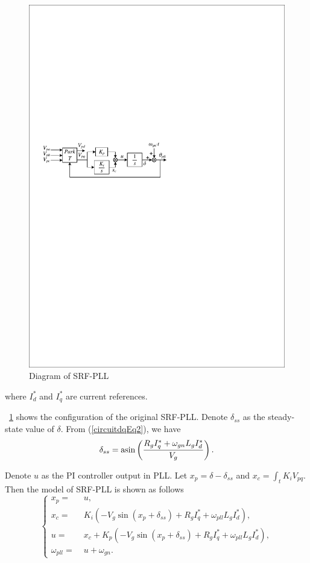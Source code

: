 \documentclass[10pt,final,journal,twoside]{IEEEtran}
\begin{document}
\begin{figure}[!t]
\centering
\includegraphics[width=.9\linewidth]{../Diagrams/PLL.pdf}
\caption{Diagram of SRF-PLL}
\label{fig_pll}
\end{figure}
where $I_d^*$ and $I_q^*$ are current references.\par
\figurename~\ref{fig_pll} shows the configuration of the original SRF-PLL. Denote $\delta_{ss}$ as the steady-state value of $\delta$. From (\ref{circuitdqEq2}), we have
\begin{equation}\label{dss}\delta_{ss}=\asin\left(\dfrac{R_gI_q^*+\omega_{gn}L_gI_d^*}{V_g}\right).\end{equation}

Denote $u$ as the PI controller output in PLL. Let $x_p=\delta-\delta_{ss}$ and $x_c=\int_tK_iV_{pq}$. Then the model of SRF-PLL is shown as follows
\begin{equation}\label{unPLL}
\left\{\begin{aligned}
    x_p=&\;u,\\
    x_c=&\;K_i\left(-V_g\sin\left(x_p+\delta_{ss}\right)+R_gI_q^*+\omega_{pll}L_gI_d^*\right),\\
    u=&\;x_c+K_p\left(-V_g\sin\left(x_p+\delta_{ss}\right)+R_gI_q^*+\omega_{pll}L_gI_d^*\right),\\
    \omega_{pll}=&\;u+\omega_{gn}.
\end{aligned}\right.
\end{equation}
\end{document}
